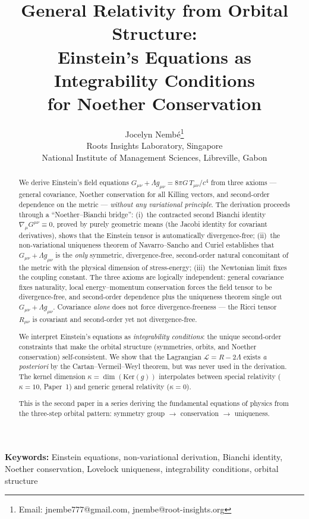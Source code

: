 \documentclass[12pt]{article}
\title{\textbf{General Relativity from Orbital Structure:\\Einstein's Equations as Integrability Conditions\\for Noether Conservation}}
\author{Jocelyn Nemb\'e\thanks{Email: jnembe777@gmail.com, jnembe@root-insights.org}\\[0.3em]
\small Roots Insights Laboratory, Singapore\\
\small National Institute of Management Sciences, Libreville, Gabon}
\date{}
\theoremstyle{plain}
\theoremstyle{definition}
\theoremstyle{remark}
\newcommand{\Ker}{\mathrm{Ker}}
\begin{document}
\maketitle

\begin{abstract}
We derive Einstein's field equations $G_{\mu\nu} + \Lambda g_{\mu\nu} = 8\pi G\,T_{\mu\nu}/c^4$ from three axioms --- general covariance, Noether conservation for all Killing vectors, and second-order dependence on the metric --- \emph{without any variational principle}. The derivation proceeds through a ``Noether--Bianchi bridge'': (i)~the contracted second Bianchi identity $\nabla_\mu G^{\mu\nu} \equiv 0$, proved by purely geometric means (the Jacobi identity for covariant derivatives), shows that the Einstein tensor is automatically divergence-free; (ii)~the non-variational uniqueness theorem of Navarro--Sancho and Curiel establishes that $G_{\mu\nu} + \Lambda g_{\mu\nu}$ is the \emph{only} symmetric, divergence-free, second-order natural concomitant of the metric with the physical dimension of stress-energy; (iii)~the Newtonian limit fixes the coupling constant. The three axioms are logically independent: general covariance fixes naturality, local energy--momentum conservation forces the field tensor to be divergence-free, and second-order dependence plus the uniqueness theorem single out $G_{\mu\nu}+\Lambda g_{\mu\nu}$. Covariance \emph{alone} does not force divergence-freeness --- the Ricci tensor $R_{\mu\nu}$ is covariant and second-order yet not divergence-free.

We interpret Einstein's equations as \emph{integrability conditions}: the unique second-order constraints that make the orbital structure (symmetries, orbits, and Noether conservation) self-consistent. We show that the Lagrangian $\mathcal{L} = R - 2\Lambda$ exists \emph{a posteriori} by the Cartan--Vermeil--Weyl theorem, but was never used in the derivation. The kernel dimension $\kappa = \dim(\Ker(g))$ interpolates between special relativity ($\kappa = 10$, Paper~1) and generic general relativity ($\kappa = 0$).

This is the second paper in a series deriving the fundamental equations of physics from the three-step orbital pattern: symmetry group $\to$ conservation $\to$ uniqueness.
\end{abstract}

\noindent\textbf{Keywords:} Einstein equations, non-variational derivation, Bianchi identity, Noether conservation, Lovelock uniqueness, integrability conditions, orbital structure
\end{document}
